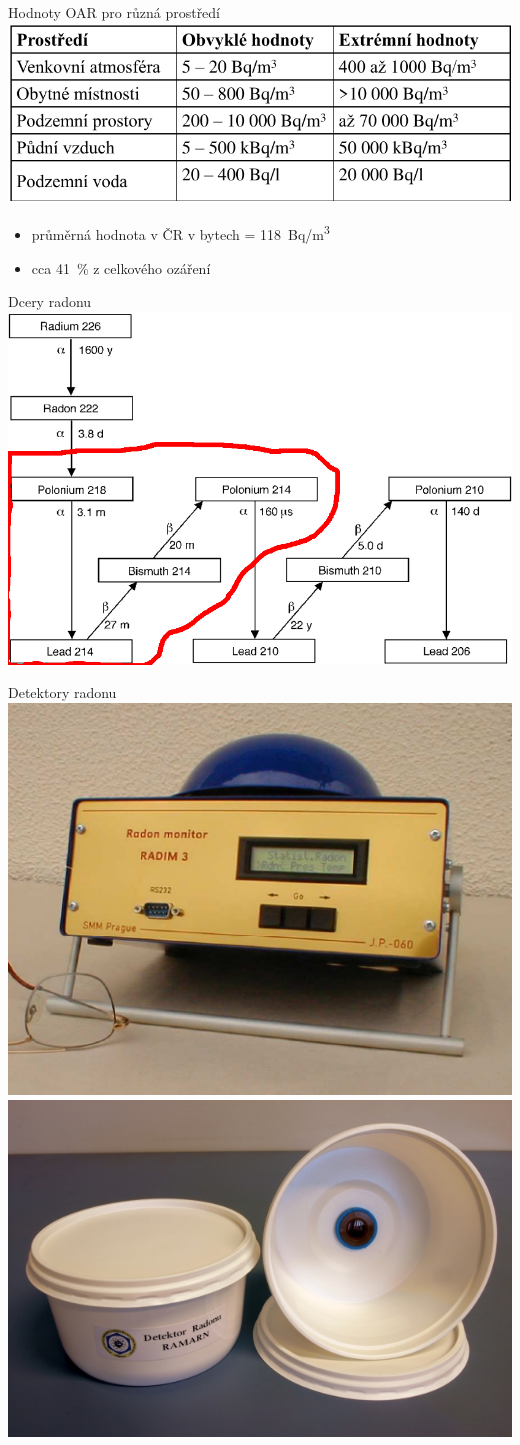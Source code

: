 \documentclass[10pt]{beamer}
\begin{document}
\begin{frame}{Hodnoty OAR pro různá prostředí}
    \small
    \centering
    \includegraphics[width=.8\textwidth]{tabulka_hodnoty_radonu.png}
    \cite{fronka}
    \begin{itemize}
        \item průměrná hodnota v ČR v bytech = \SI{118}{Bq/m^3}
        \item cca \SI{41}{\%} z celkového ozáření
    \end{itemize}
\end{frame}

\begin{frame}{Dcery radonu}
    \small
    \centering
    \includegraphics[width=.8\textwidth]{radon_chain.png}
\end{frame}

\begin{frame}{Detektory radonu}
    \small
    \centering
    \includegraphics[width=.45\textwidth]{radim.png}\cite{radim}
    \includegraphics[width=.45\textwidth]{stopac.jpg}
\end{frame}
\end{document}
